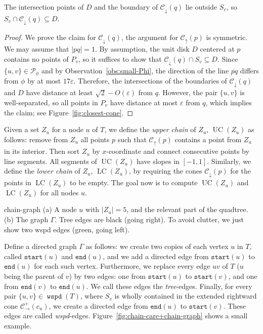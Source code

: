 \documentclass[11pt]{paper}
\newcommand {\eps} {\varepsilon}
\DeclareMathOperator {\wspd}{\texttt{wspd}}
\DeclareMathOperator {\UC}{UC}
\DeclareMathOperator {\LC}{LC}
\begin{document}
 {The intersection points of $D$ and the boundary of
$\mathcal{C}_\downarrow(q)$ lie outside $S_v$, so
$S_v \cap \mathcal{C}_\downarrow(q) \subseteq D$.}

\begin{proof}
We prove the claim for $\mathcal{C}_\downarrow(q)$, the argument for
$\mathcal{C}_\uparrow(p)$ is symmetric. We may assume that $|pq| = 1$.
By assumption, the unit disk $D$ centered at $p$ contains no points of $P_v$,
so it suffices to show that
$\mathcal{C}_\downarrow(q) \cap S_v \subseteq D$.
Since $\{u,v\} \in \mathcal{P}_\phi$
and by Observation~\ref{obs:small-Phi}, the direction of the
line $\overline{pq}$ differs from $\phi$ by at most $17\eps$.
Therefore, the intersections of the boundaries of
$\mathcal{C}_\downarrow(q)$ and $D$
have distance at least $\sqrt{2} - O(\eps)$ from $q$. However, the
pair $\{u,v\}$ is well-separated, so all points in $P_v$ have distance at
most $\eps$ from $q$, which implies the claim;
see Figure~\ref{fig:closest-cone}.
\end{proof}

Given a  set $Z_u$ for a node $u$ of $T$, we define the \emph{upper chain}
of $Z_u$, $\UC(Z_u)$ as follows:
remove from $Z_u$ all points $p$ such that
$\mathcal{C}_\uparrow(p)$ contains a point from $Z_u$
in its interior. Then sort $Z_u$ by $x$-coordinate and connect consecutive
points by 
line segments.
All segments of $\UC(Z_u)$ have slopes in $[-1,1]$.
Similarly, we define the \emph{lower chain} of $Z_u$, $\LC(Z_u)$, by requiring
the cones $\mathcal{C}_\downarrow(p)$  for the points in $\LC(Z_u)$ to be
empty. The goal now is to compute $\UC(Z_u)$ and $\LC(Z_u)$ for all
nodes $u$.

 {chain-graph}
{(a) A node $u$ with $|Z_u| = 5$, 
     and the relevant part of the quadtree. 
 (b) The graph $\Gamma$. 
 Tree edges are black (going right). To avoid clutter, we just show
 two wspd edges (green, going left).
}

Define a directed graph $\Gamma$ as follows:
we create two copies
of each vertex $u$ in $T$, called $\texttt{start}(u)$ and
$\texttt{end}(u)$, and we add a directed edge from
$\texttt{start}(u)$ to $\texttt{end}(u)$ for each
such vertex.
Furthermore,
we replace every edge $uv$ of $T$ ($u$ being the parent of $v$)
by two edges: one from $\texttt{start}(u)$ to $\texttt{start}(v)$,
and one from $\texttt{end}(v)$ to  $\texttt{end}(u)$. We
call these edges the \emph{tree}-edges.
Finally, for every pair $\{u,v\} \in \wspd(T)$, where
$S_v$ is wholly contained in the extended rightward cone
$\mathcal{C}_\rightarrow^{+}(c_u)$, we create a directed
edge from $\texttt{end}(u)$ to $\texttt{start}(v)$. These
edges are called \emph{wspd}-edges.
Figure~\ref {fig:chain-care+chain-graph} shows a small example.
\end{document}

